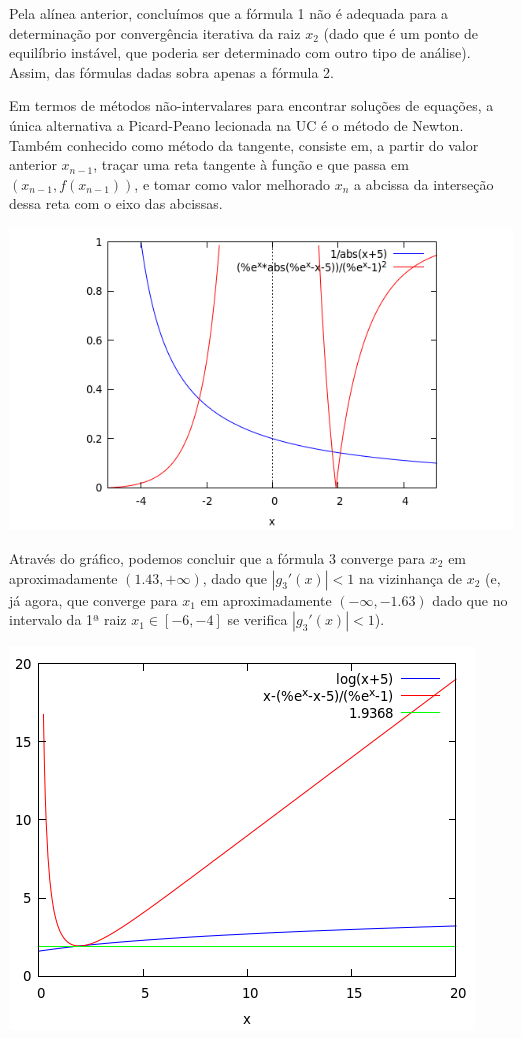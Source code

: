 {
Pela alínea anterior, concluímos que a fórmula 1 não é adequada para a determinação por convergência iterativa da raiz $x_2$ (dado que é um ponto de equilíbrio instável, que poderia ser determinado com outro tipo de análise). Assim, das fórmulas dadas sobra apenas a fórmula 2.\par
Em termos de métodos não-intervalares para encontrar soluções de equações, a única alternativa a Picard-Peano lecionada na UC é o método de Newton. Também conhecido como método da tangente, consiste em, a partir do valor anterior $x_{n-1}$, traçar uma reta tangente à função e que passa em $(x_{n-1}, f(x_{n-1}))$, e tomar como valor melhorado $x_n$ a abcissa da interseção dessa reta com o eixo das abcissas.

\begin{center} \includegraphics[scale=0.5]{2017E_3_3} \end{center}
Através do gráfico, podemos concluir que a fórmula 3 converge para $x_2$ em aproximadamente $(1.43, +\infty)$, dado que $|g_3'(x)|<1$ na vizinhança de $x_2$ (e, já agora, que converge para $x_1$ em aproximadamente $(-\infty, -1.63)$ dado que no intervalo da 1ª raiz $x_1 \in [-6,-4]$ se verifica $|g_3'(x)|<1$).
\begin{center} 
\includegraphics[scale=0.45]{2017E_3_3_02}

\end{center}}
